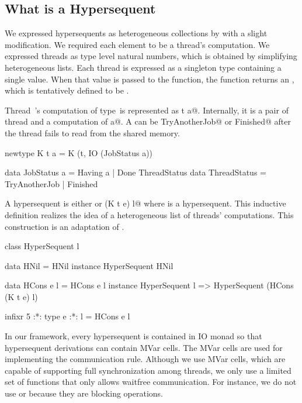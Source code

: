 \subsection{What is a Hypersequent}
We expressed hypersequents as heterogeneous collections by \citet{hetero}
with a slight modification.  We required each element to be a thread's
computation.
We expressed threads as type level natural numbers, which is obtained by
simplifying heterogeneous lists.
Each thread is expressed as a singleton type containing a single value.
When that value is passed to the \verb@atid@ function, the function returns
an \verb@AbstractThreadId@, which is tentatively defined to be \verb@Int@.
Thread~\verb@t@'s computation of type~\verb@a@ is represented as \verb@K t a@.
Internally, it is a pair of thread and a computation of \verb@JobStatus a@.
A \verb@JobStatus@ can be \verb@Done TryAnotherJob@ or \verb@Done Finished@ after the
thread fails to read from the shared memory.
\begin{code}
newtype K t a = K (t, IO (JobStatus a))

data JobStatus a = Having a | Done ThreadStatus
data ThreadStatus = TryAnotherJob | Finished
\end{code}
A hypersequent is either \verb@HNil@ or \verb@HCons (K t e) l@ where \verb@l@ is a
hypersequent.  This inductive definition realizes the idea of a
heterogeneous list of threads' computations.  This construction is an
adaptation of \citep{hetero}.
\begin{code}
class HyperSequent l

data HNil = HNil
instance HyperSequent HNil

data HCons e l = HCons e l
instance HyperSequent l =>
  HyperSequent (HCons (K t e) l)

infixr 5 :*:
type e :*: l = HCons e l
\end{code}
In our framework, every hypersequent is contained in IO monad
so that hypersequent derivations can contain MVar
cells. The MVar cells are used for implementing the communication
rule. Although we use MVar cells, which are capable of supporting full
synchronization among threads, we only use a limited set of functions
that only allows waitfree communication. For instance, we do not use
\verb@takeMVar@ or \verb@putMVar@ because they are blocking operations.

